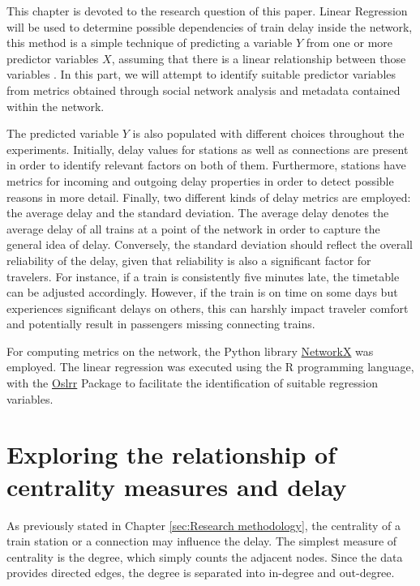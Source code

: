 \documentclass[12pt,a4paper]{article}
\newcounter{para}
\begin{document}
This chapter is devoted to the research question of this paper. Linear Regression will be used to determine possible dependencies of train delay inside the network, this method is a simple technique of predicting a variable $Y$ from one or more predictor variables $X$, assuming that there is a linear relationship between those variables \citep[p.~70]{James2023}. 
In this part, we will attempt to identify suitable predictor variables from metrics obtained through social network analysis and metadata contained within the network.

The predicted variable $Y$ is also populated with different choices throughout the experiments. Initially, delay values for stations as well as connections are present in order to identify relevant factors on both of them. 
Furthermore, stations have metrics for incoming and outgoing delay properties in order to detect possible reasons in more detail. Finally, two different kinds of delay metrics are employed: the average delay and the standard deviation. 
The average delay denotes the average delay of all trains at a point of the network in order to capture the general idea of delay. Conversely, the standard deviation should reflect the overall reliability of the delay, given that reliability is also a significant factor for travelers. 
For instance, if a train is consistently five minutes late, the timetable can be adjusted accordingly. However, if the train is on time on some days but experiences significant delays on others, this can harshly impact traveler comfort and potentially result in passengers missing connecting trains.

For computing metrics on the network, the Python library \href{https://networkx.org/}{NetworkX} was employed. The linear regression was executed using the R programming language, with the \href{https://cran.r-project.org/web/packages/olsrr/index.html}{Oslrr} Package to facilitate the identification of suitable regression variables.

\maketitle
\section{\label{sec:RealtionshipCentrality}Exploring the relationship of centrality measures and delay}


As previously stated in Chapter \ref{sec:Research methodology}, the centrality of a train station or a connection may influence the delay. The simplest measure of centrality is the degree, which simply counts the adjacent nodes. Since the data provides directed edges, the degree is separated into in-degree and out-degree. 
\end{document}
